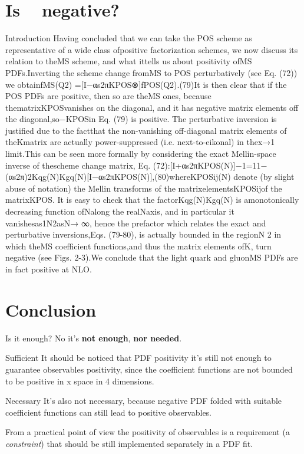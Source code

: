 \documentclass[9pt]{beamer}
\DeclareMathOperator{\msbar}{\overline{MS}}
\begin{document}
\section{Is $\msbar$ negative?}
\begin{frame}{Introduction}
    Having  concluded  that  we  can  take  the  POS  scheme  as  representative
    of  a  wide  class  ofpositive factorization schemes, we now discuss its
    relation to theMS scheme, and what ittells us about positivity ofMS
    PDFs.Inverting the scheme change fromMS to POS perturbatively (see Eq. (72)) we
    obtainfMS(Q2) =[I−αs2πKPOS⊗]fPOS(Q2).(79)It is then clear that if the POS PDFs
    are positive,  then so are theMS ones,  because thematrixKPOSvanishes on the
    diagonal, and it has negative matrix elements off the diagonal,so−KPOSin  Eq.
    (79)  is  positive.   The  perturbative  inversion  is  justified  due  to  the
    factthat  the  non-vanishing  off-diagonal  matrix  elements  of  theKmatrix
    are  actually  power-suppressed (i.e. next-to-eikonal) in thex→1 limit.This
    can  be  seen  more  formally  by  considering  the  exact  Mellin-space
    inverse  of  thescheme change matrix, Eq.
    (72):[I+αs2πKPOS(N)]−1=11−(αs2π)2Kqg(N)Kgq(N)[I−αs2πKPOS(N)],(80)whereKPOSij(N)
    denote (by slight abuse of notation) the Mellin transforms of the
    matrixelementsKPOSijof the matrixKPOS.  It is easy to check that the
    factorKqg(N)Kgq(N) is amonotonically decreasing function ofNalong the
    realNaxis, and in particular it vanishesas1N2asN→ ∞, hence the prefactor which
    relates the exact and perturbative inversions,Eqs. (79-80), is actually bounded
    in the regionN 2 in which theMS coefficient functions,and thus the matrix
    elements ofK, turn negative (see Figs. 2-3).We conclude that the light quark
    and gluonMS PDFs are in fact positive at NLO.
\end{frame}

\section{Conclusion}
\begin{frame}{Is it enough?}
    No it's \textbf{not enough}, \textbf{nor needed}.

    \begin{block}{Sufficient}
    It should be noticed that PDF positivity it's still not enough to guarantee
    observables positivity, since the coefficient functions are not bounded to
    be positive in x space in 4 dimensions.
    \end{block}

    \begin{block}{Necessary}
    It's also not necessary, because negative PDF folded with suitable
    coefficient functions can still lead to positive observables.
    \end{block}

    From a practical point of view the positivity of observables is a
    requirement (a \textit{constraint}) that should be still implemented
    separately in a PDF fit.
\end{frame}
\end{document}
